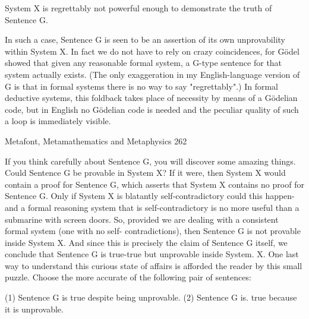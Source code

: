  System X is regrettably not powerful enough to demonstrate the truth of Sentence G.

In such a case, Sentence G is seen to be an assertion of its own unprovability within
System X. In fact we do not have to rely on crazy coincidences, for Gödel showed that
given any reasonable formal system, a G-type sentence for that system actually exists.
(The only exaggeration in my English-language version of G is that in formal systems
there is no way to say "regrettably".) In formal deductive systems, this foldback takes
place of necessity by means of a Gödelian code, but in English no Gödelian code is
needed and the peculiar quality of such a loop is immediately visible.




Metafont, Metamathematics and Metaphysics                                             262

   If you think carefully about Sentence G, you will discover some amazing things.
Could Sentence G be provable in System X? If it were, then System X would contain a
proof for Sentence G, which asserts that System X contains no proof for Sentence G.
Only if System X is blatantly self-contradictory could this happen-and a formal reasoning
system that is self-contradictory is no more useful than a submarine with screen doors.
So, provided we are dealing with a consistent formal system (one with no self-
contradictions), then Sentence G is not provable inside System X. And since this is
precisely the claim of Sentence G itself, we conclude that Sentence G is true-true but
unprovable inside System. X.
   One last way to understand this curious state of affairs is afforded the reader by this
small puzzle. Choose the more accurate of the following pair of sentences:

         (1) Sentence G is true despite being unprovable.
         (2) Sentence G is. true because it is unprovable.

